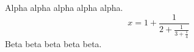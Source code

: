 \documentclass[12pt]{article}
\begin{document}
Alpha alpha alpha alpha alpha.
\[ x = 1 + \frac{1}{2 + \frac{1}{3 + \frac{1}{4}}} \]
Beta beta beta beta beta.
\end{document}
